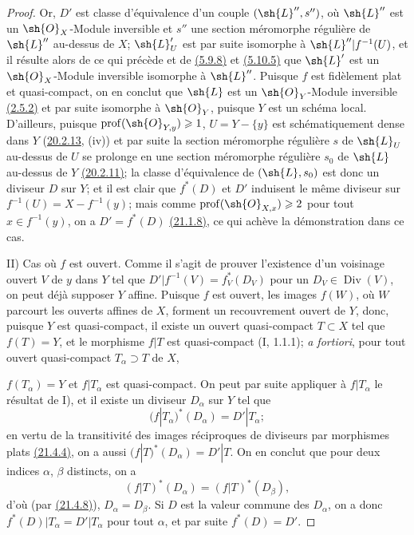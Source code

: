 \begin{proof}
Or, $D'$ est classe d'équivalence d'un couple $(\sh{L}'',s'')$, où
$\sh{L}''$ est un $\sh{O}_X$-Module inversible et $s''$ une section
méromorphe régulière de $\sh{L}''$ au-dessus de $X$; $\sh{L}'_U$ est
par suite isomorphe à $\sh{L}''|f^{-1}(U)$, et il résulte alors de ce
qui précède et de {\hyperlink{ega4.c04.prop.5-9-8}{(5.9.8)}} et
{\hyperlink{ega4.c04.thm.5-10-5}{(5.10.5)}} que $\sh{L}'$ est un
$\sh{O}_X$-Module inversible isomorphe à $\sh{L}''$. Puisque $f$ est
fidèlement plat et quasi-compact, on en conclut que $\sh{L}$ est un
$\sh{O}_Y$-Module inversible
{\hyperlink{ega4.c04.prop.2-5-2}{(2.5.2)}} et par suite isomorphe à
$\sh{O}_Y$, puisque $Y$ est un schéma local. D'ailleurs, puisque
$\operatorname{prof}(\sh{O}_{Y,y})\geq1$, $U=Y-\{y\}$ est
schématiquement dense dans $Y$
({\hyperlink{ega4.c04.statement.20-2-13}{20.2.13}}, (iv)) et par suite
la section méromorphe régulière $s$ de $\sh{L}_U$ au-dessus de $U$ se
prolonge en une section méromorphe régulière $s_0$ de $\sh{L}$
au-dessus de $Y$ {\hyperlink{ega4.c04.prop.20-2-11}{(20.2.11)}}; la
classe d'équivalence de $(\sh{L},s_0)$ est donc un diviseur $D$ sur
$Y$; et il est clair que $f^*(D)$ et $D'$ induisent le même diviseur sur
$f^{-1}(U)=X-f^{-1}(y)$; mais comme
$\operatorname{prof}(\sh{O}_{X,x})\geq2$ pour tout $x\in f^{-1}(y)$,
on a $D'=f^*(D)$ {\hyperlink{ega4.c04.prop.21-1-8}{(21.1.8)}}, ce qui
achève la démonstration dans ce cas.

\textup{II) Cas où $f$ est ouvert.} Comme il s'agit de prouver
l'existence d'un voisinage ouvert $V$ de $y$ dans $Y$ tel que
$D'|f^{-1}(V)=f_V^*(D_V)$ pour un $D_V\in\operatorname{Div}(V)$, on
peut déjà supposer $Y$ affine. Puisque $f$ est ouvert, les images
$f(W)$, où $W$ parcourt les ouverts affines de $X$, forment un
recouvrement ouvert de $Y$, donc, puisque $Y$ est quasi-compact, il
existe un ouvert quasi-compact $T\subset X$ tel que $f(T)=Y$, et le
morphisme $f|T$ est quasi-compact (I, 1.1.1); \emph{a fortiori}, pour
tout ouvert quasi-compact $T_\alpha\supset T$ de $X$,

$f(T_\alpha)=Y$ et $f|T_\alpha$ est quasi-compact. On peut par suite
appliquer à $f|T_\alpha$ le résultat de I), et il existe un diviseur
$D_\alpha$ sur $Y$ tel que
\[
 (f|T_\alpha)^*(D_\alpha)=D'|T_\alpha;
\]
en vertu de la transitivité des images réciproques de diviseurs par
morphismes plats {\hyperlink{ega4.c04.statement.21-4-4}{(21.4.4)}}, on
a aussi $(f|T)^*(D_\alpha)=D'|T$. On en conclut que pour deux indices
$\alpha$, $\beta$ distincts, on a
\[
 (f|T)^*(D_\alpha)=(f|T)^*(D_\beta),
\]
d'où (par {\hyperlink{ega4.c04.prop.21-4-8}{(21.4.8)}}),
$D_\alpha=D_\beta$. Si $D$ est la valeur commune des $D_\alpha$, on a
donc $f^*(D)|T_\alpha=D'|T_\alpha$ pour tout $\alpha$, et par suite
$f^*(D)=D'$.
\end{proof}

